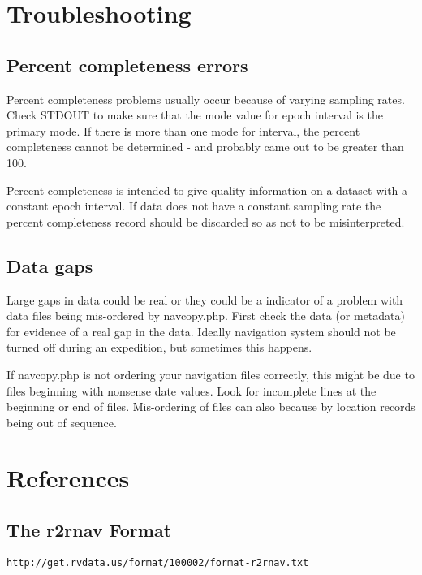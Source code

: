 \documentclass{article}
\begin{document}
	\newpage		
	\section{Troubleshooting}
	\label{troubleshooting}
		
		\subsection{Percent completeness errors}
		\label{percent_completeness_errors}
Percent completeness problems usually occur because of varying sampling rates.  Check STDOUT to make sure that the mode value for epoch interval is the primary mode.  If there is more than one mode for interval, the percent completeness cannot be determined - and probably came out to be greater than 100.
	
Percent completeness is intended to give quality information on a dataset with a constant epoch interval.  If data does not have a constant sampling rate the percent completeness record should be discarded so as not to be misinterpreted.
	
		\subsection{Data gaps}
		\label{data_gaps}
Large gaps in data could be real or they could be a indicator of a problem with data files being mis-ordered by navcopy.php.  First check the data (or metadata) for evidence of a real gap in the data.  Ideally navigation system should not be turned off during an expedition, but sometimes this happens.
	
If navcopy.php is not ordering your navigation files correctly, this might be due to files beginning with nonsense date values.  Look for incomplete lines at the beginning or end of files.  Mis-ordering of files can also because by location records being out of sequence.

	\newpage
	\section{References}
		\subsection{The r2rnav Format}
		\label{r2rnav_spec}

\begin{lstlisting}
http://get.rvdata.us/format/100002/format-r2rnav.txt
\end{lstlisting}
		
\end{document}
